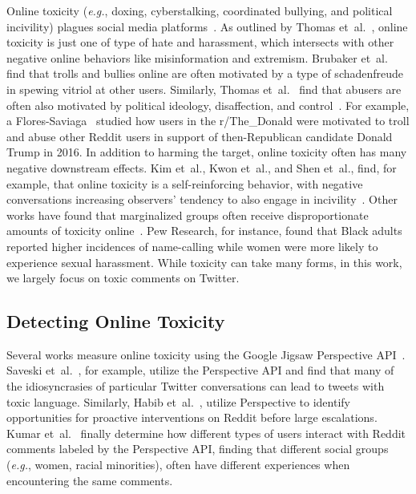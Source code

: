 Online toxicity (\textit{e.g.}, doxing,  cyberstalking, coordinated bullying, and political incivility) plagues social media platforms~\cite{thomas2021sok,cuomo2019gender,kumar2021designing,nobata2016abusive,wulczyn2017ex,chandrasekharan2018internet}. As outlined by Thomas {et~al.}~\cite{thomas2021sok}, online toxicity is just one of type of hate and harassment, which intersects with other negative online behaviors like misinformation and extremism. Brubaker et~al.~\cite{brubaker2021power} find that trolls and bullies online are often motivated by a type of schadenfreude in spewing vitriol at other users. Similarly, Thomas et~al.~\cite{thomas2021sok} find that abusers are often also motivated by political ideology, disaffection, and control~\cite{thomas2021sok}. For example, a Flores-Saviaga~\cite{flores2018mobilizing} studied how users in the r/The\_Donald were motivated to troll and abuse other Reddit users in support of then-Republican candidate Donald Trump in 2016. In addition to harming the target, online toxicity often has many negative downstream effects. Kim {et~al.}, Kwon {et~al.}, and Shen {et~al.}, find, for example, that online toxicity is a self-reinforcing behavior, with negative conversations increasing observers' tendency to also engage in incivility~\cite{kim2019incivility,kwon2017offensive,shen2020viral}. Other works have found that marginalized groups often receive disproportionate amounts of toxicity online~\cite{relia2019race,thomas2021sok,chess2015conspiracy}. Pew Research, for instance, found that Black adults reported higher incidences of name-calling while women were more likely to experience sexual harassment. While toxicity can take many forms, in this work, we largely focus on toxic comments on Twitter. 


\subsection{Detecting Online Toxicity }
Several works measure online toxicity using the Google Jigsaw Perspective API~\cite{perspectiveapi}. Saveski {et~al.}~\cite{saveski2021structure}, for example, utilize the Perspective API and find that many of the idiosyncrasies of particular Twitter conversations can lead to tweets with toxic language. Similarly, Habib {et~al.}~\cite{habib2022proactive}, utilize Perspective to identify opportunities for proactive interventions on Reddit before large escalations. Kumar {et~al.}~\cite{kumar2021designing} finally determine how different types of users interact with Reddit comments labeled by the Perspective API, finding that different social groups (\textit{e.g.}, women, racial minorities), often have different experiences when encountering the same comments. 

